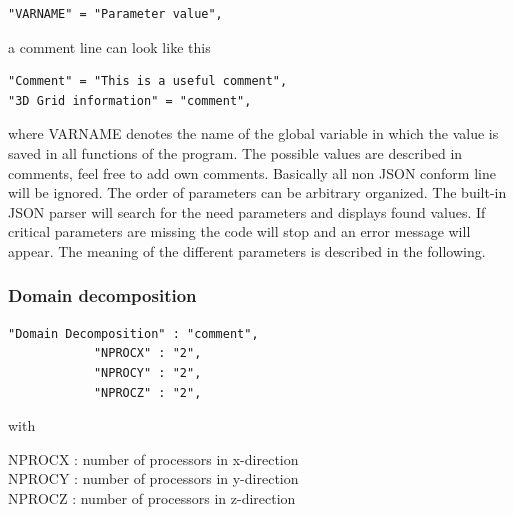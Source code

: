 \documentclass[11pt,onecolumn,oneside]{article}
\begin{document}
\begin{verbatim}
"VARNAME" = "Parameter value",
\end{verbatim}

a comment line can look like this

\begin{verbatim}
"Comment" = "This is a useful comment",
"3D Grid information" = "comment",
\end{verbatim}

where VARNAME denotes the name of the global variable in which the value is saved in all functions of the program. The possible values are described in comments, feel free to add own comments. Basically all non JSON conform line will be ignored. The order of parameters can be arbitrary organized. The built-in JSON parser will search for the need parameters and displays found values. If critical parameters are missing the code will stop and an error message will appear. The meaning of the different parameters is described in the following.

\subsubsection{Domain decomposition}

\begin{verbatim}
"Domain Decomposition" : "comment",
			"NPROCX" : "2",
			"NPROCY" : "2",
			"NPROCZ" : "2",
\end{verbatim}

with

NPROCX : number of processors in x-direction\\
NPROCY : number of processors in y-direction\\
NPROCZ : number of processors in z-direction\\
\end{document}
